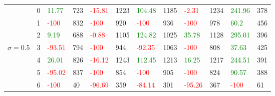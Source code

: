 \begin{table}[!htb]
\begin{adjustwidth}{-0.8in}{-0.9in}
\begin{tabular}{|p{4em}|p{2em}|p{3em}|p{3em}|p{3em}|p{3em}|p{3em}|p{3em}|p{3em}|p{3em}|p{3em}|p{3em}|}
            & 0 & \textcolor{green}{11.77} & 723 & \textcolor{red}{-15.81} & 1223 & \textcolor{green}{104.48} & 1185 & \textcolor{red}{-2.31} & 1234 & \textcolor{green}{241.96} & 378\\\cline{3-12}
            & 1 & \textcolor{red}{-100} & 832 & \textcolor{red}{-100} & 920 & \textcolor{red}{-100} & 936 & \textcolor{red}{-100} & 978 & \textcolor{green}{60.2} & 456\\\cline{3-12}
            & 2 & \textcolor{green}{9.19} & 688 & \textcolor{red}{-0.88} & 1105 & \textcolor{green}{124.82} & 1025 & \textcolor{green}{35.78} & 1128 & \textcolor{green}{295.01} & 396\\\cline{3-12}
            $\sigma=0.5$& 3 & \textcolor{red}{-93.51} & 794 & \textcolor{red}{-100} & 944 & \textcolor{red}{-92.35} & 1063 & \textcolor{red}{-100} & 808 & \textcolor{green}{37.63} & 425\\\cline{3-12}
            & 4 & \textcolor{green}{26.01} & 826 & \textcolor{red}{-16.12} & 1243 & \textcolor{green}{112.45} & 1213 & \textcolor{green}{16.25} & 1217 & \textcolor{green}{244.51} & 391\\\cline{3-12}
            & 5 & \textcolor{red}{-95.02} & 837 & \textcolor{red}{-100} & 854 & \textcolor{red}{-100} & 905 & \textcolor{red}{-100} & 824 & \textcolor{green}{90.57} & 388\\\cline{3-12}
            & 6 & \textcolor{red}{-100} & 40 & \textcolor{red}{-96.69} & 359 & \textcolor{red}{-84.14} & 301 & \textcolor{red}{-95.26} & 367 & \textcolor{red}{-100} & 61\\\hline\hline
            

\end{tabular}
\end{adjustwidth}
\end{table}
